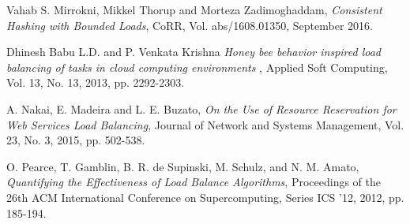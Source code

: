 \begin{thebibliography}{1}
Vahab S. Mirrokni, Mikkel Thorup and Morteza Zadimoghaddam,
  \emph{Consistent Hashing with Bounded Loads},
  CoRR,
  Vol. abs/1608.01350, September 2016.

  Dhinesh Babu L.D. and P. Venkata Krishna
  \emph{Honey bee behavior inspired load balancing of tasks in cloud computing environments },
  Applied Soft Computing,
  Vol. 13, No. 13, 2013, pp. 2292-2303.

  A. Nakai, E. Madeira and L. E. Buzato,
  \emph{On the Use of Resource Reservation for Web Services Load Balancing},
  Journal of Network and Systems Management,
  Vol. 23, No. 3, 2015, pp. 502-538.

  O. Pearce, T. Gamblin, B. R. de Supinski, M. Schulz, and N. M. Amato,
  \emph{Quantifying the Effectiveness of Load Balance Algorithms},
  Proceedings of the 26th ACM International Conference on Supercomputing,
  Series ICS '12, 2012, pp. 185-194.

\end{thebibliography}
